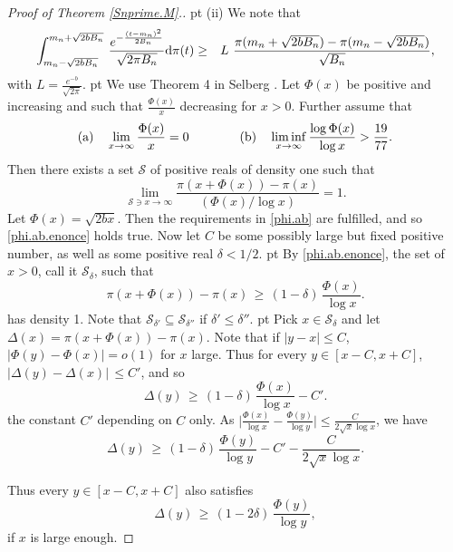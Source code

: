 \documentclass[11pt,draft,reqno]{amsart}
\theoremstyle{definition}
\theoremstyle{remarks}
\numberwithin{equation}{section}
\def \D{{\Delta}}
\def \d{{\delta}}
\def \qq{{\qquad}}
\def \dd{{\rm d}}
\begin{document}
\begin{proof}[Proof of Theorem \ref{Snprime.M}.]
 pt (ii) We note that 
  \begin{eqnarray} \label{int.min}
  \int_{m_n-\sqrt{ 2bB_n }}^{m_n+\sqrt{ 2bB_n }}
  \,\frac{ e^{- \frac{(t- m_n)^2}{    2  B_n   } } }{ \sqrt{2\pi  B_n  } } \dd \pi(t)&\ge & L \  \frac{ \pi(m_n+\sqrt{ 2bB_n })-\pi(m_n-\sqrt{ 2bB_n })}{ \sqrt{   B_n  }},
\end{eqnarray}
with $L=\frac{e^{-b }}{  \sqrt{2\pi }}$. 
 pt
 We use  Theorem 4 in  Selberg  \cite{Se}. Let    $\Phi(x)$ be positive and increasing and such that $\frac{\Phi(x)}{x} $  decreasing for $x>0$. Further assume that 
 \begin{eqnarray} \label{phi.ab}
{\rm (a)}\quad \lim_{x\to\infty}  \frac{\Phi(x)}{x}= 0 \qq\qq {\rm (b)}\quad\liminf_{x\to\infty}\frac{\log \Phi(x)}{\log x}>\frac{19}{77}.
\end{eqnarray}
Then there exists a   set $\mathcal S$   of positive reals of density one such that
 \begin{equation}  \label{phi.ab.enonce}\lim_{\mathcal S\ni x\to \infty}\frac{\pi(x+\Phi (x))-\pi(x)}{({\Phi(x)}/{\log x})}  =1.
\end{equation}
 Let $\Phi(x) = \sqrt{2b  x}$. Then the   requirements in \eqref{phi.ab} are fulfilled, and so \eqref{phi.ab.enonce} holds true. 
  Now let $C$ be some possibly large but fixed positive number, as well as some positive real $\d<1/2$.    
     pt   By \eqref{phi.ab.enonce}, the  set of $x>0$, call it $\mathcal S_\d$, such   that 
    \begin{equation}\label{pi.phi.d}
\pi(x+\Phi(x))-\pi(x) \, \ge  \,(1-\d)\, \frac{ \Phi(x)}{\log x}.
 \end{equation}
  has    density 1. 
  Note that   $\mathcal S_{\d'}\subseteq \mathcal S_{\d''}$ if  $\d'\le \d''$.   
  pt Pick  $x\in\mathcal S_\d$ and let $\D(x)= \pi(x+\Phi(x))-\pi(x)$. Note that if $|y-x|\le C$,   $\big|\Phi(y)-\Phi(x)\big|=o(1)$ for $x$   large.
 Thus  for every $y\in [x-C,x+C]$, $\big|\D(y)-\D(x)\big|\, \le C'$, and so 
$$\D(y)   \, \ge  \,(1-\d)\, \frac{ \Phi(x)}{\log x}-C'.$$
 the constant $C'$ depending on $C$ only. 
 As $\big|\frac{\Phi(x)}{\log x}- \frac{\Phi(y)}{\log y}\big|\le 
\frac{C}{2\sqrt x \log x}$, we have 
\begin{equation*}
\D(y)   \, \ge  \,(1-\d)\, \frac{ \Phi(y)}{\log y}-C' -\frac{C}{2\sqrt x \log x}.
 \end{equation*} 
  
Thus every $y\in [x-C,x+C]$ also satisfies \begin{equation}\label{pi.phi.d.a}
\D(y)   \, \ge  \,(1-2\d)\, \frac{ \Phi(y)}{\log y},
 \end{equation} 
 if  $x $ is large enough.
 

\end{proof}
\end{document}
